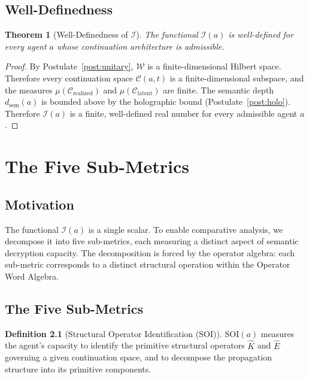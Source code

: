 \documentclass[12pt,anyside]{book}
\theoremstyle{plain}
\newtheorem{theorem}{Theorem}[chapter]
\theoremstyle{definition}
\newtheorem{definition}{Definition}[chapter]
\newcommand{\W}{\mathcal{W}}          %
\newcommand{\Ehat}{\hat{E}}            %
\newcommand{\Ical}{\mathcal{I}}        %
\newcommand{\SOI}{\mathrm{SOI}}        %
\begin{document}
\section{Well-Definedness}

\begin{theorem}[Well-Definedness of $\Ical$]\label{thm:welldef}
The functional $\Ical(a)$ is well-defined for every agent $a$ whose continuation architecture is admissible.
\end{theorem}

\begin{proof}
By Postulate~\ref{post:unitary}, $\W$ is a finite-dimensional Hilbert space. Therefore every continuation space $\mathcal{C}(a,t)$ is a finite-dimensional subspace, and the measures $\mu(\mathcal{C}_{\mathrm{realized}})$ and $\mu(\mathcal{C}_{\mathrm{latent}})$ are finite. The semantic depth $d_{\mathrm{sem}}(a)$ is bounded above by the holographic bound (Postulate~\ref{post:holo}). Therefore $\Ical(a)$ is a finite, well-defined real number for every admissible agent $a$.
\end{proof}

\chapter{The Five Sub-Metrics}

\section{Motivation}

The functional $\Ical(a)$ is a single scalar. To enable comparative analysis, we decompose it into five sub-metrics, each measuring a distinct aspect of semantic decryption capacity. The decomposition is forced by the operator algebra: each sub-metric corresponds to a distinct structural operation within the Operator Word Algebra.

\section{The Five Sub-Metrics}

\begin{definition}[Structural Operator Identification ($\SOI$)]\label{def:soi}
$\SOI(a)$ measures the agent's capacity to identify the primitive structural operators $\hat{K}$ and $\Ehat$ governing a given continuation space, and to decompose the propagation structure into its primitive components.
\end{definition}
\end{document}
